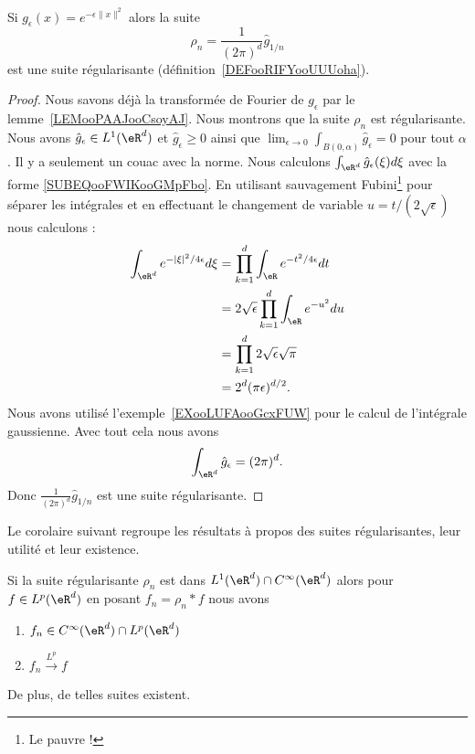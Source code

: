 \begin{lemma}       \label{LEMooTDWSooSBJXdv}
    Si \( g_{\epsilon}(x)= e^{-\epsilon\| x \|^2}\) alors la suite
    \begin{equation}        \label{EQooWQWZooZIYGpq}
        \rho_n=\frac{1}{ (2\pi)^d }\hat g_{1/n}
    \end{equation}
    est une suite régularisante (définition~\ref{DEFooRIFYooUUUoha}).
\end{lemma}

\begin{proof}
    Nous savons déjà la transformée de Fourier de \( g_{\epsilon}\) par le lemme~\ref{LEMooPAAJooCsoyAJ}. Nous montrons que la suite \( \rho_n\) est régularisante. Nous avons \( \hat g_{\epsilon}\in L^1(\eR^d)\) et \( \hat g_{\epsilon}\geq 0\) ainsi que \( \lim_{\epsilon\to 0}\int_{B(0,\alpha)}\hat  g_{\epsilon}=0\) pour tout \( \alpha\). Il y a seulement un couac avec la norme. Nous calculons \( \int_{\eR^d}\hat g_{\epsilon}(\xi)d\xi\) avec la forme \eqref{SUBEQooFWIKooGMpFbo}. En utilisant sauvagement Fubini\footnote{Le pauvre !} pour séparer les intégrales et en effectuant le changement de variable \( u=t/(2\sqrt{ \epsilon })\) nous calculons :
        \begin{subequations}
            \begin{align}
                \int_{\eR^d} e^{-| \xi |^2/4\epsilon}d\xi&=\prod_{k=1}^d\int_{\eR} e^{-t^2/4\epsilon}dt\\
                &=2\sqrt{ \epsilon }\prod_{k=1}^d\int_{\eR} e^{-u^2}du\\
                &=\prod_{k=1}^d2\sqrt{ \epsilon }\sqrt{ \pi }\\
                &=2^d(\pi\epsilon)^{d/2}.
            \end{align}
        \end{subequations}
        Nous avons utilisé l'exemple~\ref{EXooLUFAooGcxFUW} pour le calcul de l'intégrale gaussienne. Avec tout cela nous avons
        \begin{equation}
            \int_{\eR^d}\hat g_{\epsilon}=(2\pi)^d.
        \end{equation}
        Donc \( \frac{1}{ (2\pi)^d }\hat g_{1/n}\) est une suite régularisante.
\end{proof}

Le corolaire suivant regroupe les résultats à propos des suites régularisantes, leur utilité et leur existence.
\begin{corollary}       \label{CORooQLELooUjzIoM}
    Si la suite régularisante \( \rho_n\) est dans \( L^1(\eR^d)\cap  C^{\infty}(\eR^d)\) alors pour \( f\in L^p(\eR^d)\) en posant \( f_n=\rho_n*f\) nous avons
    \begin{enumerate}
        \item
            \( f_n\in C^{\infty}(\eR^d)\cap L^p(\eR^d)\)
        \item
            \( f_n\stackrel{L^p}{\longrightarrow}f\)
    \end{enumerate}
    De plus, de telles suites existent.
\end{corollary}

